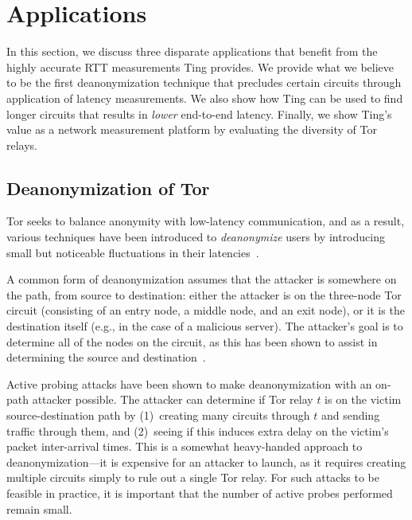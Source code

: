 \section{Applications}
\label{sec:applications}

In this section, we discuss three disparate applications that benefit
from the highly accurate RTT measurements Ting provides.
%
We provide what we believe to be the first deanonymization technique that
precludes certain circuits through application of latency measurements.
%
We also show how Ting can be used to find longer circuits that results
in \emph{lower} end-to-end latency.
%
Finally, we show Ting's value as a network measurement platform by
evaluating the diversity of Tor relays.

\subsection{Deanonymization of Tor} %
\label{sec:deanon}


Tor seeks to balance anonymity with low-latency communication, and as a
result, various techniques have been introduced to \emph{deanonymize}
users by introducing small but noticeable fluctuations in their
latencies~\cite{low-cost-traffic-analysis, practical-congestion, latency-leak, spying}.
%


A common form of deanonymization assumes that the attacker is somewhere
on the path, from source to destination: either the attacker is on the
three-node Tor circuit (consisting of an entry node, a middle node, and
an exit node), or it is the destination itself (e.g., in the case of a
malicious server).
%
The attacker's goal is to determine all of the nodes on the circuit,
as this has been shown to assist in determining the source and
destination~\cite{latency-leak}.


Active probing attacks have been shown to make deanonymization with an
on-path attacker possible.
%
The attacker can determine if Tor relay $t$ is on the victim
source-destination path by (1)~creating many circuits through $t$ and
sending traffic through them, and (2)~seeing if this induces extra
delay on the victim's packet inter-arrival times.
%
This is a somewhat heavy-handed approach to deanonymization---it is
expensive for an attacker to launch, as it requires creating multiple
circuits simply to rule out a single Tor relay.
%
For such attacks to be feasible in practice, it is important that the
number of active probes performed remain small.



